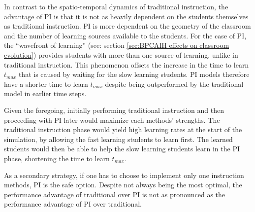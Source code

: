 In contrast to the spatio-temporal dynamics of traditional instruction, the advantage of PI is that it is not as heavily dependent on the students themselves as traditional instruction.
PI is more dependent on the geometry of the classroom and the number of learning sources available to the students.
For the case of PI, the ``wavefront of learning'' (see: section \ref{sec:BPCAIH effects on classroom evolution}) provides students with more than one source of learning, unlike in traditional instruction. 
This phenomenon offsets the increase in the time to learn $t_{max}$ that is caused by waiting for the slow learning students.
PI models therefore have a shorter time to learn $t_{max}$ despite being outperformed by the traditional model in earlier time steps.

Given the foregoing, initially performing traditional instruction and then proceeding with PI later would maximize each methods' strengths. 
The traditional instruction phase would yield high learning rates at the start of the simulation, by allowing the fast learning students to learn first.
The learned students would then be able to help the slow learning students learn in the PI phase, shortening the time to learn $t_{max}$.

As a secondary strategy, if one has to choose to implement only one instruction methods, PI is the safe option. Despite not always being the most optimal, the performance advantage of traditional over PI is not as pronounced as the performance advantage of PI over traditional.

